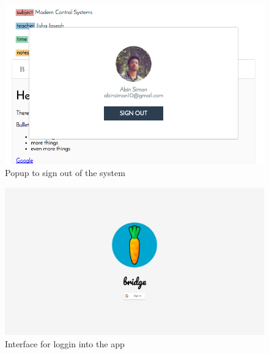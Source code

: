 \begin{figure}[htb]
    \centering
    \includegraphics[width=\linewidth]{signoutpopup.png}
    \caption{Popup to sign out of the system}
    \label{fig:signoutpopup} %
\end{figure}

\begin{figure}[htb]
    \centering
    \includegraphics[width=\linewidth]{loginpopup.png}
    \caption{Interface for loggin into the app}
    \label{fig:loginpopup} %
\end{figure}

